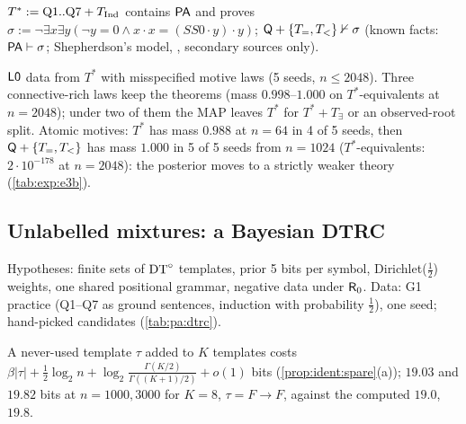 \begin{proposition}\pabrk{}\label{prop:pa:atomic}
$T^*:=\mathrm{Q1..Q7}+T_{\mathrm{Ind}}$ contains $\mathsf{PA}$ and proves $\sigma:=\neg\exists x\exists y(\neg y=0\wedge x\cdot x=(SS0\cdot y)\cdot y)$; $\mathsf{Q}+\{T_=,T_<\}\nvdash\sigma$ (known facts: $\mathsf{PA}\vdash\sigma$; Shepherdson's model, \citealp{shepherdson1964nonstandard}, secondary sources only).
\end{proposition}

\begin{remark}[E3(b)]\pabrk{}\label{rem:pa:e3b}
$\mathord{\mathsf{L0}}$ data from $T^*$ with misspecified motive laws (5 seeds, $n\le2048$). Three connective-rich laws keep the theorems (mass $0.998$--$1.000$ on $T^*$-equivalents at $n=2048$); under two of them the MAP leaves $T^*$ for $T^*+T_\exists$ or an observed-root split. Atomic motives: $T^*$ has mass $0.988$ at $n=64$ in 4 of 5 seeds, then $\mathsf{Q}+\{T_=,T_<\}$ has mass $1.000$ in 5 of 5 seeds from $n=1024$ ($T^*$-equivalents: $2\cdot10^{-178}$ at $n=2048$): the posterior moves to a strictly weaker theory (\cref{tab:exp:e3b}).
\end{remark}

\subsection{Unlabelled mixtures: a Bayesian DTRC}\label{sec:pa:dtrc}

Hypotheses: finite sets of $\mathrm{DT}^{\circ}$ templates, prior 5 bits per symbol, Dirichlet($\frac12$) weights, one shared positional grammar, negative data under $\mathsf{R}_{0}$. Data: G1 practice (Q1--Q7 as ground sentences, induction with probability $\frac12$), one seed; hand-picked candidates (\cref{tab:pa:dtrc}).

\begin{proposition}\pabrk{}\label{prop:pa:spare}
A never-used template $\tau$ added to $K$ templates costs $\beta|\tau|+\frac12\log_2n+\log_2\frac{\Gamma(K/2)}{\Gamma((K+1)/2)}+o(1)$ bits (\cref{prop:ident:spare}(a)); $19.03$ and $19.82$ bits at $n=1000,3000$ for $K=8$, $\tau=F\to F$, against the computed $19.0$, $19.8$.
\end{proposition}

